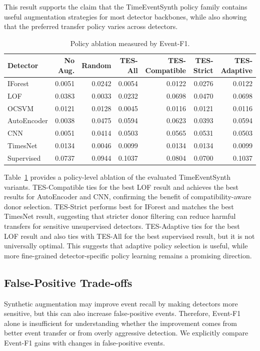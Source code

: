 \documentclass[conference]{IEEEtran}
\begin{document}
This result supports the claim that the TimeEventSynth policy family contains useful augmentation strategies for most detector backbones, while also showing that the preferred transfer policy varies across detectors.


\begin{table}[t]
\centering
\caption{Policy ablation measured by Event-F1.}
\label{tab:ablation}
\begin{tabular}{lrrrrrr}
\toprule
Detector & No Aug. & Random & TES-All & TES-Compatible & TES-Strict & TES-Adaptive \\
\midrule
IForest     & 0.0051 & 0.0242 & 0.0054 & 0.0122 & 0.0276 & 0.0122 \\
LOF         & 0.0383 & 0.0033 & 0.0232 & 0.0698 & 0.0470 & 0.0698 \\
OCSVM       & 0.0121 & 0.0128 & 0.0045 & 0.0116 & 0.0121 & 0.0116 \\
AutoEncoder & 0.0038 & 0.0475 & 0.0594 & 0.0623 & 0.0393 & 0.0594 \\
CNN         & 0.0051 & 0.0414 & 0.0503 & 0.0565 & 0.0531 & 0.0503 \\
TimesNet    & 0.0134 & 0.0046 & 0.0099 & 0.0134 & 0.0134 & 0.0099 \\
Supervised  & 0.0737 & 0.0944 & 0.1037 & 0.0804 & 0.0700 & 0.1037 \\
\bottomrule
\end{tabular}
\end{table}

Table~\ref{tab:ablation} provides a policy-level ablation of the evaluated
TimeEventSynth variants. TES-Compatible ties for the best LOF result and
achieves the best results for AutoEncoder and CNN, confirming the benefit of
compatibility-aware donor selection. TES-Strict performs best for IForest and
matches the best TimesNet result, suggesting that stricter donor filtering can
reduce harmful transfers for sensitive unsupervised detectors. TES-Adaptive ties
for the best LOF result and also ties with TES-All for the best supervised
result, but it is not universally optimal. This suggests that adaptive policy
selection is useful, while more fine-grained detector-specific policy learning
remains a promising direction.


\subsection{False-Positive Trade-offs}
\label{sec:false_positive_tradeoffs}

Synthetic augmentation may improve event recall by making detectors more
sensitive, but this can also increase false-positive events. Therefore, Event-F1 alone is insufficient for understanding whether the improvement comes from better event transfer or from overly aggressive detection. We explicitly compare Event-F1 gains with changes in false-positive events.
\end{document}
